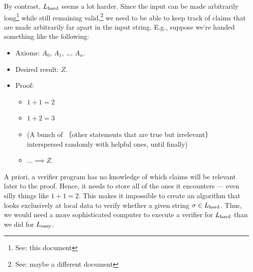 \documentclass{fkpaper}
\newcommand{\np}[1]{\hspace{-.55em}〔#1〕\hspace{-.55em}}
\begin{document}
\begin{multicols}{2}
  By contrast, $L_{\rm hard}$ seems a lot harder. Since the input can be
  made arbitrarily long\footnote{See: this document} while still
  remaining valid,\footnote{See: maybe a different document} we need to
  be able to keep track of claims that are made arbitrarily far apart in
  the input string. E.g., suppose we're handed something like the
  following:
  \begin{itemize}
    \item Axioms: $A_0$, $A_1$, \ldots, $A_n$.
    \item Desired result: $Z$.
    \item Proof:
      \begin{itemize}
        \item $1 + 1 = 2$
        \item $1 + 2 = 3$
        \item (A bunch of \np{other statements that are true but
          irrelevant} interspersed randomly with helpful ones, until
          finally)
        \item $\ldots \implies Z$.
      \end{itemize}
  \end{itemize}
  A priori, a verifier program has no knowledge of which claims will be
  relevant later to the proof. Hence, it needs to store all of the ones
  it encounters --- even silly things like $1+1 = 2$. This makes it
  impossible to create an algorithm that looks exclusively at local data
  to verify whether a given string $\sigma \in L_{\rm hard}$. Thus, we
  would need a more sophisticated computer to execute a verifier for
  $L_{\rm hard}$ than we did for $L_{\rm easy}$.



\end{multicols}
\end{document}
